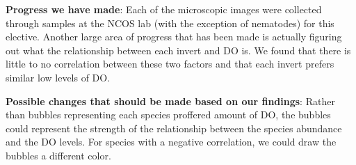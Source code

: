 \documentclass[
  letterpaper,
  DIV=11,
  numbers=noendperiod]{scrartcl}
\begin{document}
\textbf{Progress we have made}: Each of the microscopic images were
collected through samples at the NCOS lab (with the exception of
nematodes) for this elective. Another large area of progress that has
been made is actually figuring out what the relationship between each
invert and DO is. We found that there is little to no correlation
between these two factors and that each invert prefers similar low
levels of DO.

\textbf{Possible changes that should be made based on our findings}:
Rather than bubbles representing each species proffered amount of DO,
the bubbles could represent the strength of the relationship between the
species abundance and the DO levels. For species with a negative
correlation, we could draw the bubbles a different color.
\end{document}
